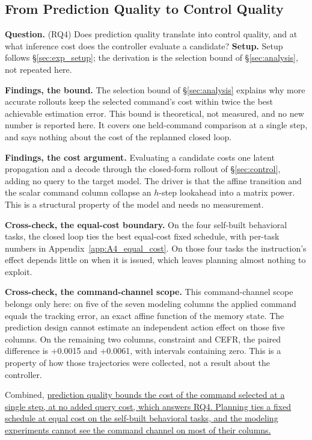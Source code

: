 \subsection{From Prediction Quality to Control Quality}
\label{sec:exp_analysis}

\textbf{Question.} (RQ4) Does prediction quality translate into control quality, and at what inference cost does the controller evaluate a candidate?
\textbf{Setup.} Setup follows \S\ref{sec:exp_setup}; the derivation is the selection bound of \S\ref{sec:analysis}, not repeated here.

\textbf{Findings, the bound.} The selection bound of \S\ref{sec:analysis} explains why more accurate rollouts keep the selected command's cost within twice the best achievable estimation error.  %
This bound is theoretical, not measured, and no new number is reported here.  %
It covers one held-command comparison at a single step, and says nothing about the cost of the replanned closed loop.  %

\textbf{Findings, the cost argument.} Evaluating a candidate costs one latent propagation and a decode through the closed-form rollout of \S\ref{sec:control}, adding no query to the target model.  %
The driver is that the affine transition and the scalar command column collapse an $h$-step lookahead into a matrix power.  %
This is a structural property of the model and needs no measurement.  %

\textbf{Cross-check, the equal-cost boundary.} On the four self-built behavioral tasks, the closed loop ties the best equal-cost fixed schedule, with per-task numbers in Appendix~\ref{app:A4_equal_cost}.  %
On those four tasks the instruction's effect depends little on when it is issued, which leaves planning almost nothing to exploit.  %

\textbf{Cross-check, the command-channel scope.} This command-channel scope belongs only here: on five of the seven modeling columns the applied command equals the tracking error, an exact affine function of the memory state.  %
The prediction design cannot estimate an independent action effect on those five columns.  %
On the remaining two columns, constraint and CEFR, the paired difference is +0.0015 and +0.0061, with intervals containing zero.  %
This is a property of how those trajectories were collected, not a result about the controller.  %

Combined, \uline{prediction quality bounds the cost of the command selected at a single step, at no added query cost, which answers RQ4. Planning ties a fixed schedule at equal cost on the self-built behavioral tasks, and the modeling experiments cannot see the command channel on most of their columns.}
